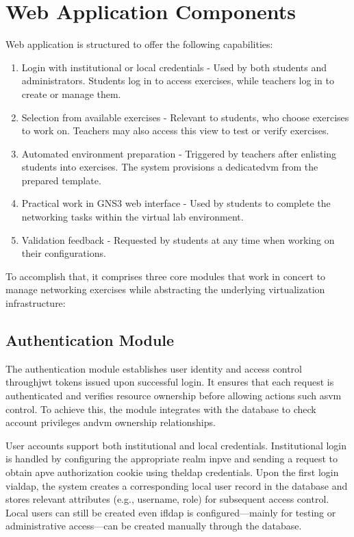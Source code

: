 \section{Web Application Components}
    Web application is structured to offer the following capabilities:
        \begin{enumerate}
            \item Login with institutional or local credentials - Used by both students and administrators. Students log in to access 
            exercises, while teachers log in to create or manage them. 

            \item Selection from available exercises - Relevant to students, who choose exercises to work on. Teachers may also access 
            this view to test or verify exercises.

            \item Automated environment preparation - Triggered by teachers after enlisting students into exercises. The system provisions 
            a dedicated\ac{vm} from the prepared template.

            \item Practical work in GNS3 web interface - Used by students to complete the networking tasks within the virtual lab environment.

            \item Validation feedback - Requested by students at any time when working on their configurations.

        \end{enumerate}

    To accomplish that, it comprises three core modules that work in concert to manage networking exercises while 
    abstracting the underlying virtualization infrastructure:

    \subsection{Authentication Module}

        The authentication module establishes user identity and access control through\ac{jwt} tokens issued 
        upon successful login. It ensures that each request is authenticated and verifies resource ownership 
        before allowing actions such as\ac{vm} control. To achieve this, the module integrates with the database 
        to check account privileges and\ac{vm} ownership relationships.

        User accounts support both institutional and local credentials. Institutional login is handled by configuring 
        the appropriate realm in\ac{pve} and sending a request to obtain a\ac{pve} authorization cookie using the\ac{ldap} 
        credentials. Upon the first login via\ac{ldap}, the system creates a corresponding local user record in the 
        database and stores relevant attributes (e.g., username, role) for subsequent access control. Local users can 
        still be created even if\ac{ldap} is configured—mainly for testing or administrative access—can be created manually 
        through the database.

